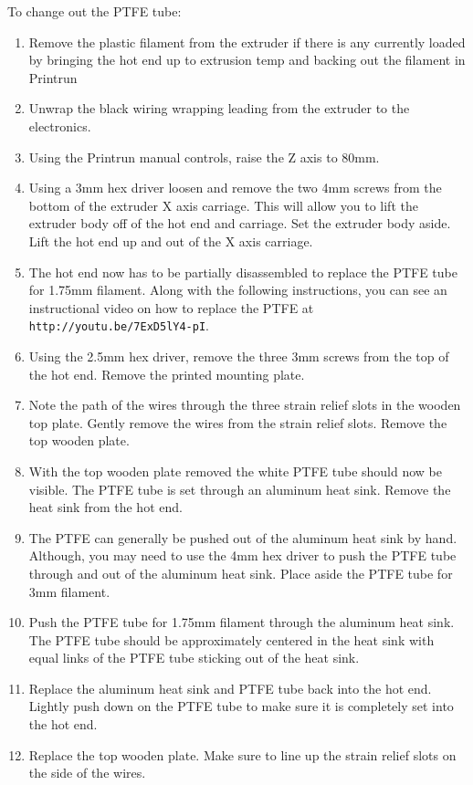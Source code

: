 To change out the PTFE tube:
\begin{enumerate}
\item Remove the plastic filament from the extruder if there is any currently loaded by bringing the hot end up to extrusion temp and backing out the filament in Printrun

\item Unwrap the black wiring wrapping leading from the extruder to the electronics.
\item Using the Printrun manual controls, raise the Z axis to 80mm.
\item Using a 3mm hex driver loosen and remove the two 4mm screws from the bottom of the extruder X axis carriage. This will allow you to lift the extruder body off of the hot end and carriage. Set the extruder body aside. Lift the hot end up and out of the X axis carriage.
\item The hot end now has to be partially disassembled to replace the PTFE tube for 1.75mm filament. Along with the following instructions, you can see an instructional video on how to replace the PTFE at \texttt{http://youtu.be/7ExD5lY4-pI}. 
\item Using the 2.5mm hex driver, remove the three 3mm screws from the top of the hot end. Remove the printed mounting plate.
\item Note the path of the wires through the three strain relief slots in the wooden top plate. Gently remove the wires from the strain relief slots. Remove the top wooden plate.
\item With the top wooden plate removed the white PTFE tube should now be visible. The PTFE tube is set through an aluminum heat sink. Remove the heat sink from the hot end.
\item The PTFE can generally be pushed out of the aluminum heat sink by hand. Although, you may need to use the 4mm hex driver to push the PTFE tube through and out of the aluminum heat sink. Place aside the PTFE tube for 3mm filament.
\item Push the PTFE tube for 1.75mm filament through the aluminum heat sink. The PTFE tube should be approximately centered in the heat sink with equal links of the PTFE tube sticking out of the heat sink.
\item Replace the aluminum heat sink and PTFE tube back into the hot end. Lightly push down on the PTFE tube to make sure it is completely set into the hot end.
\item Replace the top wooden plate. Make sure to line up the strain relief slots on the side of the wires.

\end{enumerate}
